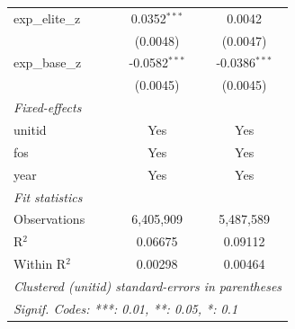 \begin{tabular}{lcc}
   exp\_elite\_z   & 0.0352$^{***}$  & 0.0042\\   
                   & (0.0048)        & (0.0047)\\   
   exp\_base\_z    & -0.0582$^{***}$ & -0.0386$^{***}$\\   
                   & (0.0045)        & (0.0045)\\   
   \midrule
   \emph{Fixed-effects}\\
   unitid          & Yes             & Yes\\  
   fos             & Yes             & Yes\\  
   year            & Yes             & Yes\\  
   \midrule
   \emph{Fit statistics}\\
   Observations    & 6,405,909       & 5,487,589\\  
   R$^2$           & 0.06675         & 0.09112\\  
   Within R$^2$    & 0.00298         & 0.00464\\  
   \midrule \midrule
   \multicolumn{3}{l}{\emph{Clustered (unitid) standard-errors in parentheses}}\\
   \multicolumn{3}{l}{\emph{Signif. Codes: ***: 0.01, **: 0.05, *: 0.1}}\\
\end{tabular}
\par\endgroup


